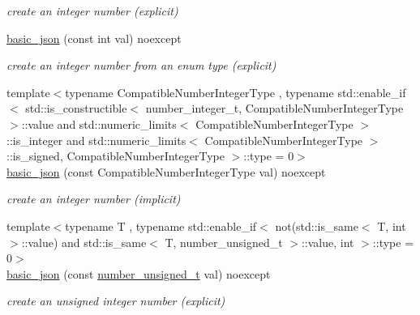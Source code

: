 \begin{DoxyCompactItemize}
\begin{DoxyCompactList}\small\item\em create an integer number (explicit) \end{DoxyCompactList}\item 
\hyperlink{classnlohmann_1_1basic__json_a70ae1f0747f5b7a89979512866474f1a}{basic\+\_\+json} (const int val) noexcept
\begin{DoxyCompactList}\small\item\em create an integer number from an enum type (explicit) \end{DoxyCompactList}\item 
{\footnotesize template$<$typename Compatible\+Number\+Integer\+Type , typename std\+::enable\+\_\+if$<$                                                              std\+::is\+\_\+constructible$<$ number\+\_\+integer\+\_\+t, Compatible\+Number\+Integer\+Type $>$\+::value and                                                           std\+::numeric\+\_\+limits$<$ Compatible\+Number\+Integer\+Type $>$\+::is\+\_\+integer and                                                           std\+::numeric\+\_\+limits$<$ Compatible\+Number\+Integer\+Type $>$\+::is\+\_\+signed,                                                           Compatible\+Number\+Integer\+Type $>$\+::type  = 0$>$ }\\\hyperlink{classnlohmann_1_1basic__json_ad2eddc2c13ab084f067eaba65d381ad2}{basic\+\_\+json} (const Compatible\+Number\+Integer\+Type val) noexcept
\begin{DoxyCompactList}\small\item\em create an integer number (implicit) \end{DoxyCompactList}\item 
{\footnotesize template$<$typename T , typename std\+::enable\+\_\+if$<$                                                              not(std\+::is\+\_\+same$<$ T, int $>$\+::value) and                                                           std\+::is\+\_\+same$<$ T, number\+\_\+unsigned\+\_\+t $>$\+::value, int $>$\+::type  = 0$>$ }\\\hyperlink{classnlohmann_1_1basic__json_a85b09b03916d3d1e73373f49cdd4136d}{basic\+\_\+json} (const \hyperlink{classnlohmann_1_1basic__json_a60a04166c122072ab11eaf9845d9cd1d}{number\+\_\+unsigned\+\_\+t} val) noexcept
\begin{DoxyCompactList}\small\item\em create an unsigned integer number (explicit) \end{DoxyCompactList}\item 

\end{DoxyCompactItemize}

